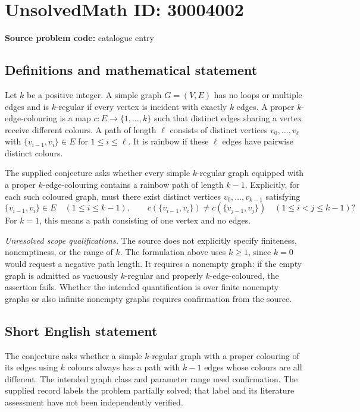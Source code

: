 \documentclass[11pt]{article}
\begin{document}
\section*{UnsolvedMath ID: 30004002}
\textbf{Source problem code:} catalogue entry
\subsection{Definitions and mathematical statement}
Let \(k\) be a positive integer. A simple graph \(G=(V,E)\) has no loops or multiple edges and is \(k\)-regular if every vertex is incident with exactly \(k\) edges. A proper \(k\)-edge-colouring is a map \(c:E\to\{1,\ldots,k\}\) such that distinct edges sharing a vertex receive different colours. A path of length \(\ell\) consists of distinct vertices \(v_0,\ldots,v_\ell\) with \(\{v_{i-1},v_i\}\in E\) for \(1\le i\le\ell\). It is rainbow if these \(\ell\) edges have pairwise distinct colours.

The supplied conjecture asks whether every simple \(k\)-regular graph equipped with a proper \(k\)-edge-colouring contains a rainbow path of length \(k-1\). Explicitly, for each such coloured graph, must there exist distinct vertices \(v_0,\ldots,v_{k-1}\) satisfying
\[
\{v_{i-1},v_i\}\in E\quad(1\le i\le k-1),
\qquad
c(\{v_{i-1},v_i\})\ne c(\{v_{j-1},v_j\})
\quad(1\le i<j\le k-1)?
\]
For \(k=1\), this means a path consisting of one vertex and no edges.

\emph{Unresolved scope qualifications.} The source does not explicitly specify finiteness, nonemptiness, or the range of \(k\). The formulation above uses \(k\ge1\), since \(k=0\) would request a negative path length. It requires a nonempty graph: if the empty graph is admitted as vacuously \(k\)-regular and properly \(k\)-edge-coloured, the assertion fails. Whether the intended quantification is over finite nonempty graphs or also infinite nonempty graphs requires confirmation from the source.
\subsection{Short English statement}
The conjecture asks whether a simple \(k\)-regular graph with a proper colouring of its edges using \(k\) colours always has a path with \(k-1\) edges whose colours are all different. The intended graph class and parameter range need confirmation. The supplied record labels the problem partially solved; that label and its literature assessment have not been independently verified.
\end{document}
